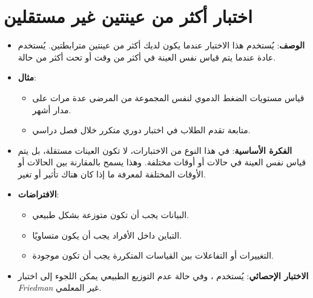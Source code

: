 	\section{اختبار أكثر من عينتين غير مستقلين }
	\begin{itemize}
		\item \textbf{الوصف}: يُستخدم هذا الاختبار عندما يكون لديك أكثر من عينتين مترابطتين. يُستخدم عادة عندما يتم قياس نفس العينة في أكثر من وقت أو تحت أكثر من حالة.
		\item \textbf{مثال}:
		\begin{itemize}
			\item قياس مستويات الضغط الدموي لنفس المجموعة من المرضى عدة مرات على مدار أشهر.
			\item متابعة تقدم الطلاب في اختبار دوري متكرر خلال فصل دراسي.
		\end{itemize}
		\item \textbf{الفكرة الأساسية}: في هذا النوع من الاختبارات، لا تكون العينات مستقلة، بل يتم قياس نفس العينة في حالات أو أوقات مختلفة. وهذا يسمح بالمقارنة بين الحالات أو الأوقات المختلفة لمعرفة ما إذا كان هناك تأثير أو تغير.
		\item \textbf{الافتراضات}:
		\begin{itemize}
			\item البيانات يجب أن تكون متوزعة بشكل طبيعي.
			\item التباين داخل الأفراد يجب أن يكون متساويًا.
			\item التغييرات أو التفاعلات بين القياسات المتكررة يجب أن تكون موجودة.
		\end{itemize}
		\item \textbf{الاختبار الإحصائي}: يُستخدم \textit{}، وفي حالة عدم التوزيع الطبيعي يمكن اللجوء إلى اختبار \textit{Friedman} غير المعلمي.
	\end{itemize}
	

